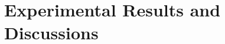 \documentclass{article} %
\begin{document}















\section{Experimental Results and Discussions}
\end{document}
